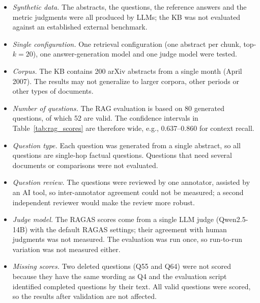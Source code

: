 \documentclass[bdcc,article,submit,pdftex,moreauthors]{Definitions/mdpi}
\newcommand{\commentRed}[1]{\textcolor{red}{#1}}
\begin{document}
\begin{itemize}
    \item \textit{Synthetic data.} The abstracts, the questions, the reference answers and the metric judgments were all produced by LLMs; the KB was not evaluated against an established external benchmark.

    \item \textit{Single configuration.} One retrieval configuration (one abstract per chunk, top-$k = 20$), one answer-generation model and one judge model were tested. 

    \item \textit{Corpus.} The KB contains 200 arXiv abstracts from a single month (April 2007). The results may not generalize to larger corpora, other periods or other types of documents.

    \item \textit{Number of questions.} The RAG evaluation is based on 80 generated questions, of which 52 are valid. The confidence intervals in Table~\ref{tab:rag_scores} are therefore wide, e.g., 0.637--0.860 for context recall.

    \item \textit{Question type.} Each question was generated from a single abstract, so all questions are single-hop factual questions. Questions that need several documents or comparisons were not evaluated.

        \item \textit{Question review.} The questions were reviewed by one annotator, assisted by an AI tool, so inter-annotator agreement could not be measured; a second independent reviewer would make the review more robust.

    \item \textit{Judge model.} The RAGAS scores come from a single LLM judge (Qwen2.5-14B) with the default RAGAS settings; their agreement with human judgments was not measured. The evaluation was run once, so run-to-run variation was not measured either.

    \item \textit{Missing scores.} Two deleted questions (Q55 and Q64) were not scored because they have the same wording as Q4 and the evaluation script identified completed questions by their text. All valid questions were scored, so the results after validation are not affected.

\end{itemize}
\end{document}
